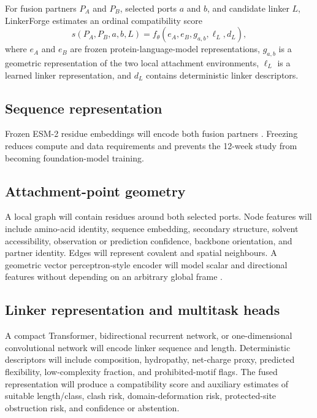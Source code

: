 \documentclass[10pt,a4paper]{article}
\begin{document}
For fusion partners $P_A$ and $P_B$, selected ports $a$ and $b$, and candidate linker $L$, LinkerForge estimates an ordinal compatibility score
\begin{equation}
  s(P_A,P_B,a,b,L)=f_{\theta}\!\left(e_A,e_B,g_{a,b},\ell_L,d_L\right),
\end{equation}
where $e_A$ and $e_B$ are frozen protein-language-model representations, $g_{a,b}$ is a geometric representation of the two local attachment environments, $\ell_L$ is a learned linker representation, and $d_L$ contains deterministic linker descriptors.

\subsection{Sequence representation}

Frozen ESM-2 residue embeddings will encode both fusion partners \citep{lin2023}. Freezing reduces compute and data requirements and prevents the 12-week study from becoming foundation-model training.

\subsection{Attachment-point geometry}

A local graph will contain residues around both selected ports. Node features will include amino-acid identity, sequence embedding, secondary structure, solvent accessibility, observation or prediction confidence, backbone orientation, and partner identity. Edges will represent covalent and spatial neighbours. A geometric vector perceptron-style encoder will model scalar and directional features without depending on an arbitrary global frame \citep{jing2021}.

\subsection{Linker representation and multitask heads}

A compact Transformer, bidirectional recurrent network, or one-dimensional convolutional network will encode linker sequence and length. Deterministic descriptors will include composition, hydropathy, net-charge proxy, predicted flexibility, low-complexity fraction, and prohibited-motif flags. The fused representation will produce a compatibility score and auxiliary estimates of suitable length/class, clash risk, domain-deformation risk, protected-site obstruction risk, and confidence or abstention.
\end{document}
